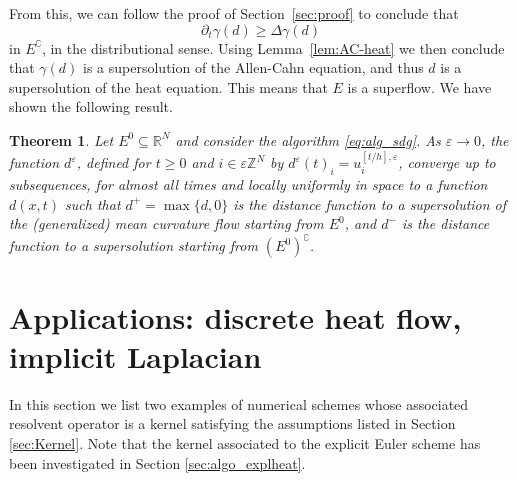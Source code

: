 \documentclass[10pt]{amsart}
\theoremstyle{plain}
\newtheorem{theorem}{Theorem}[section]
\theoremstyle{definition}
\newcommand{\R}{\mathbb{R}}
\newcommand{\Z}{\mathbb{Z}}
\newcommand{\g}{\gamma}
\newcommand{\comp}[1]{{#1}^\complement}
\newcommand{\e}{\varepsilon}
\numberwithin{equation}{section}
\begin{document}
From this, we can follow the proof of Section~\ref{sec:proof} to conclude that 
\[
\partial_t \g(d)\ge \Delta \g(d)
\]
in $E^\complement$, in the distributional sense. Using Lemma~\ref{lem:AC-heat} we then conclude that $\g(d)$ is a supersolution of the Allen-Cahn equation, and thus $d$ is a supersolution of the heat equation. This means that $E$ is a superflow. We have shown the following result.
\begin{theorem}\label{th:mainnonlin}
  Let $E^0\subseteq \R^N$ and consider the algorithm \eqref{eq:alg_sdg}. As $\e\to 0$, the function $d^\e$, defined for $t\ge 0$ and $i\in\e\Z^N$
  by $d^\e(t)_i = u^{[t/h],\e}_i$, converge up to subsequences,
  for almost all times and locally uniformly in space to a function
  $d(x,t)$ such that $d^+=\max\{d,0\}$ is the distance function
  to a supersolution of the (generalized)
  mean curvature flow starting from $E^0$,
  and $d^-$ is the distance function to a supersolution starting from
  $\comp{(E^0)}$.
\end{theorem}

\section{Applications: discrete heat flow, implicit Laplacian}\label{sec:applic}
In this section we list two examples of numerical schemes whose associated resolvent operator is a kernel satisfying the assumptions listed in Section \ref{sec:Kernel}. Note that the kernel associated to the explicit Euler scheme has been investigated in Section \ref{sec:algo_explheat}.
\end{document}
